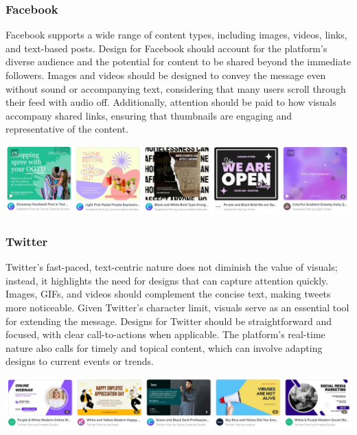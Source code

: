 \documentclass[
]{book}
\begin{document}
\hypertarget{facebook-1}{%
\subsubsection*{Facebook}\label{facebook-1}}

Facebook supports a wide range of content types, including images, videos, links, and text-based posts. Design for Facebook should account for the platform's diverse audience and the potential for content to be shared beyond the immediate followers. Images and videos should be designed to convey the message even without sound or accompanying text, considering that many users scroll through their feed with audio off. Additionally, attention should be paid to how visuals accompany shared links, ensuring that thumbnails are engaging and representative of the content.

\href{https://www.canva.com/facebook-posts/templates/}{\includegraphics[width=1\textwidth,height=\textheight]{images/clipboard-1380762122.png}}

\hypertarget{twitter-1}{%
\subsubsection*{Twitter}\label{twitter-1}}

Twitter's fast-paced, text-centric nature does not diminish the value of visuals; instead, it highlights the need for designs that can capture attention quickly. Images, GIFs, and videos should complement the concise text, making tweets more noticeable. Given Twitter's character limit, visuals serve as an essential tool for extending the message. Designs for Twitter should be straightforward and focused, with clear call-to-actions when applicable. The platform's real-time nature also calls for timely and topical content, which can involve adapting designs to current events or trends.

\href{https://www.canva.com/twitter/templates/posts/}{\includegraphics[width=1\textwidth,height=\textheight]{images/clipboard-2219953613.png}}
\end{document}
